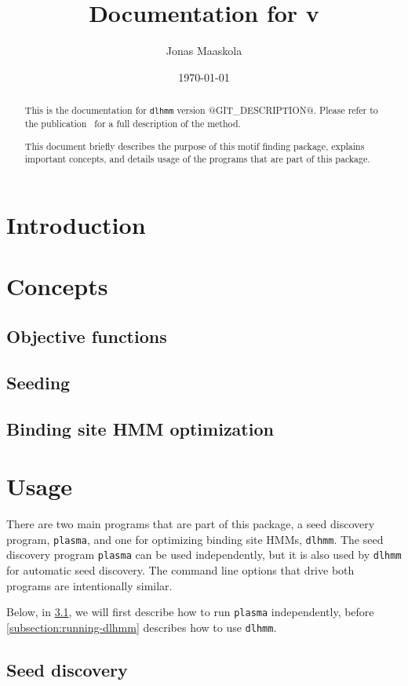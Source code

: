 \documentclass[a4paper]{article}
\title{Documentation for \dlhmm{} v\version{}}
\author{Jonas Maaskola}
\date{\today}
\makeatletter
\newcommand{\plasma}[0]{\texttt{plasma}}
\newcommand{\dlhmm}[0]{\texttt{dlhmm}}
\newcommand{\version}[0]{@GIT_DESCRIPTION@}
\makeatother
\begin{document}
\maketitle

\begin{abstract}
  This is the documentation for \dlhmm{} version \version{}.
  Please refer to the publication~\cite{Maaskola2013} for a full description of the method.

  This document briefly describes the purpose of this motif finding package, explains important concepts, and details usage of the programs that are part of this package.
\end{abstract}

\tableofcontents

\section{Introduction}

\section{Concepts}
\subsection{Objective functions}
\subsection{Seeding}
\subsection{Binding site HMM optimization}

\section{Usage}
There are two main programs that are part of this package, a seed discovery program, \plasma{}, and one for optimizing binding site HMMs, \dlhmm{}.
The seed discovery program \plasma{} can be used independently, but it is also used by \dlhmm{} for automatic seed discovery.
The command line options that drive both programs are intentionally similar.

Below, in \cref{subsection:running-plasma}, we will first describe how to run \plasma{} independently, before \cref{subsection:running-dlhmm} describes how to use \dlhmm{}.

\subsection{Seed discovery}
\label{subsection:running-plasma}
\end{document}
